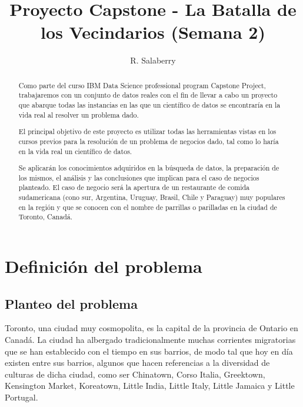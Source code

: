 \documentclass[10pt,a4paper,arial, spanish]{article}
\title{Proyecto Capstone - La Batalla de los Vecindarios (Semana 2)}
\author{R. Salaberry}
\begin{document}
\maketitle

\begin{abstract}
	Como parte del curso IBM Data Science professional program Capstone Project, trabajaremos con un conjunto de datos reales con el fin de llevar a cabo un proyecto que abarque todas las instancias en las que un científico de datos se encontraría en la vida real al resolver un problema dado.
	
	El principal objetivo de este proyecto es utilizar todas las herramientas vistas en los cursos previos para la resolución de un problema de negocios dado, tal como lo haría en la vida real un científico de datos. 
	
	Se aplicarán los conocimientos adquiridos en la búsqueda de datos, la preparación de los mismos, el análisis y las conclusiones que implican para el caso de negocios planteado.
	El caso de negocio será la apertura de un restaurante de comida sudamericana (cono sur, Argentina, Uruguay, Brasil, Chile y Paraguay) muy populares en la región y que se conocen con el nombre de parrillas o parilladas en la ciudad de Toronto, Canadá. 
	 
	
\end{abstract}


\tableofcontents
\section{Definición del problema}
\subsection{Planteo del problema}
Toronto, una ciudad muy cosmopolita,  es la capital de la provincia de Ontario en Canadá. La ciudad ha albergado tradicionalmente muchas corrientes migratorias que se han establecido con el tiempo en sus barrios, de modo tal que hoy en día existen entre sus barrios, algunos que hacen referencias a la diversidad de culturas de dicha ciudad, como ser Chinatown, Corso Italia, Greektown, Kensington Market, Koreatown, Little India, Little Italy, Little Jamaica y Little Portugal.

\end{document}
